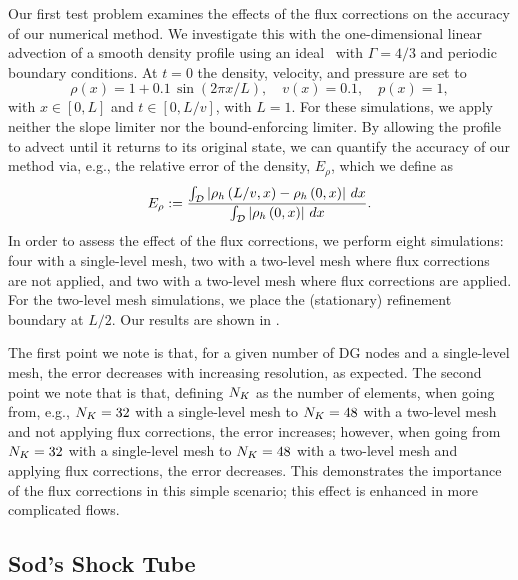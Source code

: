 Our first test problem examines the effects of the flux corrections on the
accuracy of our numerical method.
We investigate this with the one-dimensional linear advection of a
smooth density profile using an ideal \eos\ with $\Gamma=4/3$
and periodic boundary conditions.
At $t=0$ the density, velocity, and pressure are set to
\begin{equation}
  \rho\left(x\right)=1+0.1\,\sin\left(2\pi x/L\right),
  \hspace{1em}v\left(x\right)=0.1,\hspace{1em}p\left(x\right)=1,
\end{equation}
with $x\in\left[0,L\right]$ and $t\in\left[0,L/v\right]$, with $L=1$.
For these simulations, we apply neither the slope limiter nor the
bound-enforcing limiter.
By allowing the profile to advect until it returns to its original state,
we can quantify the accuracy of our method via, e.g., the relative error of
the density, $E_{\rho}$, which we define as
\begin{equation}
  E_{\rho}
  :=\frac{\int_{\mathcal{D}}\left|\rho_{h}\left(L/v,x\right)
          -\rho_{h}\left(0,x\right)\right|\,dx}
         {\int_{\mathcal{D}}\left|\rho_{h}\left(0,x\right)\right|\,dx}.
  \label{eq.Error}
\end{equation}
In order to assess the effect of the flux corrections, we perform eight
simulations: four with a single-level mesh, two with a two-level mesh
where flux corrections are not applied,
and two with a two-level mesh where flux corrections are applied.
For the two-level mesh simulations, we place the (stationary)
refinement boundary at $L/2$.
Our results are shown in .


The first point we note is that, for a given number of DG nodes and
a single-level mesh, the error decreases with increasing
resolution, as expected.
The second point we note that is that, defining $N_{K}$ as the number of
elements, when going from, e.g., $N_{K}=32$ with a single-level mesh
to $N_{K}=48$ with a two-level mesh and not applying flux corrections,
the error increases;
however, when going from $N_{K}=32$ with a single-level mesh
to $N_{K}=48$ with a two-level mesh and applying flux corrections,
the error decreases.
This demonstrates the importance of the flux corrections in this simple
scenario;
this effect is enhanced in more complicated flows.

\subsection{Sod's Shock Tube}


